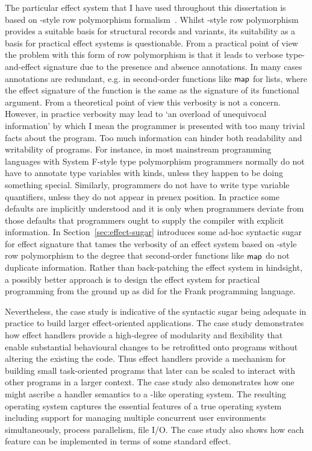 \documentclass[12pt,phd,lfcs,twoside,openright,logo,leftchapter,normalheadings]{infthesis}
\theoremstyle{plain}
\theoremstyle{definition}
\begin{document}
The particular effect system that I have used throughout this
dissertation is based on \citeauthor{Remy93}-style row polymorphism
formalism~\cite{Remy93}. Whilst \citeauthor{Remy93}-style row
polymorphism provides a suitable basis for structural records and
variants, its suitability as a basis for practical effect systems is
questionable. From a practical point of view the problem with this
form of row polymorphism is that it leads to verbose type-and-effect
signature due to the presence and absence annotations. In many cases
annotations are redundant, e.g. in second-order functions like
$\mathsf{map}$ for lists, where the effect signature of the function is
the same as the signature of its functional argument. From a
theoretical point of view this verbosity is not a concern. However, in
practice verbosity may lead to `an overload of unequivocal
information' by which I mean the programmer is presented with too many
trivial facts about the program. Too much information can hinder both
readability and writability of programs. For instance, in most
mainstream programming languages with System F-style type polymorphism
programmers normally do not have to annotate type variables with
kinds, unless they happen to be doing something special. Similarly,
programmers do not have to write type variable quantifiers, unless
they do not appear in prenex position. In practice some defaults are
implicitly understood and it is only when programmers deviate from
those defaults that programmers ought to supply the compiler with
explicit information. In Section~\ref{sec:effect-sugar} introduces
some ad-hoc syntactic sugar for effect signature that tames the
verbosity of an effect system based on \citeauthor{Remy93}-style row
polymorphism to the degree that second-order functions like
$\mathsf{map}$ do not duplicate information. Rather than back-patching
the effect system in hindsight, a possibly better approach is to
design the effect system for practical programming from the ground up
as \citet{LindleyMM17} did for the Frank programming language.

Nevertheless, the \UNIX{} case study is indicative of the syntactic
sugar being adequate in practice to build larger effect-oriented
applications. The case study demonstrates how effect handlers provide
a high-degree of modularity and flexibility that enable substantial
behavioural changes to be retrofitted onto programs without altering
the existing the code. Thus effect handlers provide a mechanism for
building small task-oriented programs that later can be scaled to
interact with other programs in a larger context.
%
The case study also demonstrates how one might ascribe a handler
semantics to a \UNIX{}-like operating system. The resulting operating
system \OSname{} captures the essential features of a true operating
system including support for managing multiple concurrent user
environments simultaneously, process parallelism, file I/O. The case
study also shows how each feature can be implemented in terms of some
standard effect.
\end{document}
